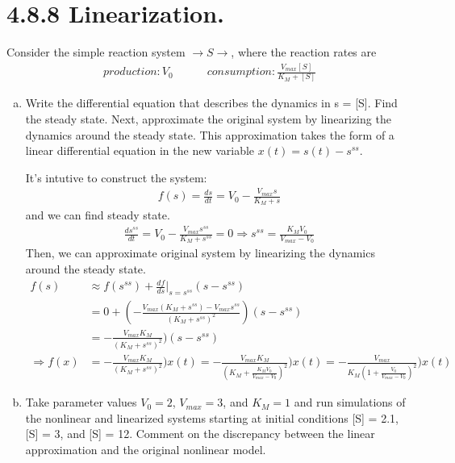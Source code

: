 \documentclass[paper=a4, fontsize=11pt]{scrartcl} %
\numberwithin{equation}{section} %
\numberwithin{figure}{section} %
\numberwithin{table}{section} %
\begin{document}
\section{4.8.8 Linearization.}
	Consider the simple reaction system $\rightarrow S \rightarrow$, where the reaction rates are
	\begin{gather*}
			production: V_0 \quad \quad \quad consumption: \frac{V_{max}[S]}{K_M+[S]}
	\end{gather*} 
	\begin{enumerate}[a)]
		\item Write the differential equation that describes the dynamics in s = [S]. Find the steady state. Next, approximate the original system by linearizing the dynamics around the steady state. This approximation takes the form of a linear differential equation in the new variable $x(t) = s(t)-s^{ss}$.

		It's intutive to construct the system:
		\begin{align*}
			f(s)=\frac{ds}{dt}=V_0-\frac{V_{max}s}{K_M+s}
		\end{align*}
		and we can find steady state.
		\begin{gather*}
			\frac{ds^{ss}}{dt}=V_0- \frac{V_{max}s^{ss}}{K_M+s^{ss}}=0 \Rightarrow s^{ss}=\frac{K_MV_0}{V_{max}-V_0}
		\end{gather*}
		Then, we can approximate original system by linearizing the dynamics around the steady state.
		\begin{align*}
			f(s)&\approx f(s^{ss})+\frac{df}{ds}|_{s=s^{ss}}(s-s^{ss})  \\
				&=0+(-\frac{V_{max}(K_M+s^{ss})-V_{max}s^{ss}}{(K_M+s^{ss})^2})(s-s^{ss}) \\
				&=-\frac{V_{max}K_M}{(K_M+s^{ss})^2})(s-s^{ss})\\
			\Rightarrow f(x)&=-\frac{V_{max}K_M}{(K_M+s^{ss})^2})x(t)=-\frac{V_{max}K_M}{(K_M+\frac{K_MV_0}{V_{max}-V_0})^2})x(t)=-\frac{V_{max}}{K_M(1+\frac{V_0}{V_{max}-V_0})^2})x(t)
		\end{align*}
		\item Take parameter values $V_0 = 2$, $V_{max} = 3$, and $K_M = 1$ and run simulations of the nonlinear and linearized systems starting at initial conditions [S] = 2.1, [S] = 3, and [S] = 12. Comment on the discrepancy between the linear approximation and the original nonlinear model.


\end{enumerate}
\end{document}
